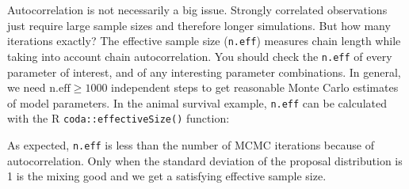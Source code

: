 \documentclass[
  12pt,
]{krantz}
\newenvironment{Shaded}{\begin{snugshade}}{\end{snugshade}}
\newcommand{\DecValTok}[1]{\textcolor[rgb]{0.00,0.00,0.81}{#1}}
\newcommand{\DocumentationTok}[1]{\textcolor[rgb]{0.56,0.35,0.01}{\textbf{\textit{#1}}}}
\newcommand{\FloatTok}[1]{\textcolor[rgb]{0.00,0.00,0.81}{#1}}
\newcommand{\FunctionTok}[1]{\textcolor[rgb]{0.13,0.29,0.53}{\textbf{#1}}}
\newcommand{\NormalTok}[1]{#1}
\newcommand{\OtherTok}[1]{\textcolor[rgb]{0.56,0.35,0.01}{#1}}
\newcommand{\SpecialCharTok}[1]{\textcolor[rgb]{0.81,0.36,0.00}{\textbf{#1}}}
\newcommand{\StringTok}[1]{\textcolor[rgb]{0.31,0.60,0.02}{#1}}
\begin{document}
Autocorrelation is not necessarily a big issue. Strongly correlated observations just require large sample sizes and therefore longer simulations. But how many iterations exactly? The effective sample size (\texttt{n.eff}) measures chain length while taking into account chain autocorrelation. You should check the \texttt{n.eff} of every parameter of interest, and of any interesting parameter combinations. In general, we need \(\text{n.eff} \geq 1000\) independent steps to get reasonable Monte Carlo estimates of model parameters. In the animal survival example, \texttt{n.eff} can be calculated with the R \texttt{coda::effectiveSize()} function:

\begin{Shaded}
\end{Shaded}

As expected, \texttt{n.eff} is less than the number of MCMC iterations because of autocorrelation. Only when the standard deviation of the proposal distribution is 1 is the mixing good and we get a satisfying effective sample size.
\end{document}
